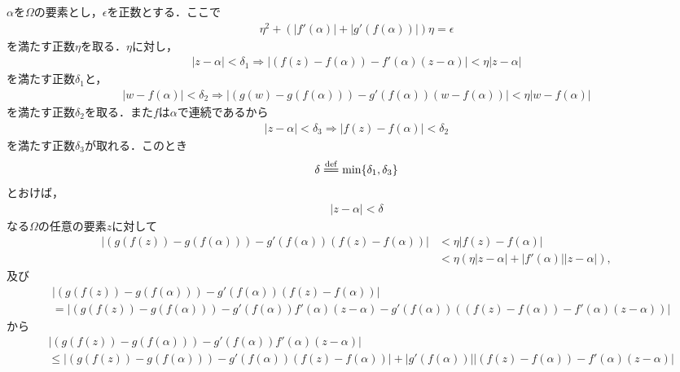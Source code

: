 	\begin{sketch}
		$\alpha$を$\Omega$の要素とし，$\epsilon$を正数とする．ここで
		\begin{align}
			\eta^2 + \left(|f'(\alpha)| + |g'(f(\alpha))| \right) \eta = \epsilon
		\end{align}
		を満たす正数$\eta$を取る．$\eta$に対し，
		\begin{align}
			|z-\alpha| < \delta_1 \Longrightarrow
			\left| (f(z) - f(\alpha)) - f'(\alpha)(z-\alpha) \right| < \eta |z-\alpha|
		\end{align}
		を満たす正数$\delta_1$と，
		\begin{align}
			|w-f(\alpha)| < \delta_2 \Longrightarrow
			\left| (g(w) - g(f(\alpha))) - g'(f(\alpha))(w-f(\alpha)) \right| < \eta |w-f(\alpha)|
		\end{align}
		を満たす正数$\delta_2$を取る．また$f$は$\alpha$で連続であるから
		\begin{align}
			|z-\alpha| < \delta_3 \Longrightarrow \left| f(z) - f(\alpha) \right| < \delta_2
		\end{align}
		を満たす正数$\delta_3$が取れる．このとき
		\begin{align}
			\delta \defeq \operatorname{min}\{\delta_1, \delta_3\}
		\end{align}
		とおけば，
		\begin{align}
			|z-\alpha| < \delta
		\end{align}
		なる$\Omega$の任意の要素$z$に対して
		\begin{align}
			\left| \left(g(f(z)) - g(f(\alpha))\right) - g'(f(\alpha))(f(z)-f(\alpha)) \right| 
			&< \eta |f(z)-f(\alpha)| \\
			&< \eta \left( \eta|z-\alpha| + |f'(\alpha)||z-\alpha| \right),
		\end{align}
		及び
		\begin{align}
			&\left| \left(g(f(z)) - g(f(\alpha))\right) - g'(f(\alpha))(f(z)-f(\alpha)) \right| \\
			&= \left| \left(g(f(z)) - g(f(\alpha))\right) - g'(f(\alpha))f'(\alpha)(z-\alpha)
			- g'(f(\alpha)) \left( (f(z) - f(\alpha)) - f'(\alpha)(z-\alpha) \right) \right|
		\end{align}
		から
		\begin{align}
			&\left| \left(g(f(z)) - g(f(\alpha))\right) - g'(f(\alpha))f'(\alpha)(z-\alpha) \right| \\
			&\leq \left| \left(g(f(z)) - g(f(\alpha))\right) - g'(f(\alpha))(f(z)-f(\alpha)) \right|
			+ \left| g'(f(\alpha)) \right| \left| (f(z) - f(\alpha)) - f'(\alpha)(z-\alpha) \right|

\end{align}
\end{sketch}
